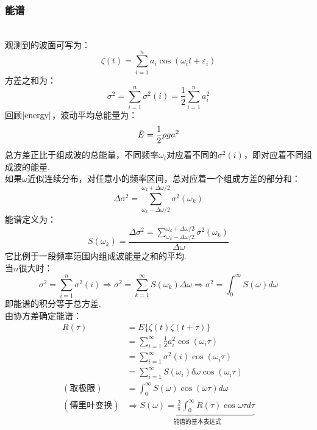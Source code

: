 \documentclass[a4paper,12pt]{article}
\begin{document}
    \subsubsection{能谱}~{}\\
    观测到的波面可写为：
    \[
        \zeta(t)=\sum_{i=1}^{n} a_{i} \cos \left(\omega_{i} t+\varepsilon_{i}\right)
    \]
    方差之和为：
    \[
        \sigma^{2}=\sum_{i=1}^{n} \sigma^{2}(i)=\frac{1}{2} \sum_{i=1}^{n} a_{i}^{2}
    \]
    回顾$\ref{energy}$，波动平均总能量为：
    \[
        \bar E = {1 \over 2}\rho g{a^2}
    \]
    总方差正比于组成波的总能量，不同频率$\displaystyle \omega_i$对应着不同的$\displaystyle \sigma^2(i)$，即对应着不同组成波的能量.\\
    如果$\omega$近似连续分布，对任意小的频率区间，总对应着一个组成方差的部分和：
    \[
        \Delta \sigma^{2}=\sum_{\omega_{k}-\Delta \omega / 2}^{\omega_{k}+\Delta \omega / 2} \sigma^{2}\left(\omega_{k}\right)
    \]
    能谱定义为：
    \[
        S(\omega_k)=\frac{\Delta \sigma^{2}=\sum_{\omega_{k}-\Delta \omega / 2}^{\omega_{k}+\Delta \omega / 2} \sigma^{2}\left(\omega_{k}\right)}{\Delta \omega}
    \]
    它比例于一段频率范围内组成波能量之和的平均.\\
    当$n$很大时：
    \[
        \sigma^{2}=\sum_{i=1}^{n} \sigma^{2}(i) \Rightarrow \sigma^{2}=\sum_{k=1}^{\infty} S\left(\omega_{k}\right) \Delta \omega \Rightarrow \sigma^{2}=\int_{0}^{\infty} S(\omega) d \omega
    \]
    即能谱的积分等于总方差.\\
    由协方差确定能谱：
    \[
        \begin{aligned}
            R(\tau)&=E\{\zeta(t)\zeta(t+\tau)\}\\
            &=\sum_{i=1}^{\infty}\frac{1}{2}a_i^2\cos (\omega_i \tau)\\
            &=\sum_{i=1}^{\infty} \sigma^{2}(i) \cos \left(\omega_{i} \tau\right)\\
            &=\sum_{i=1}^{\infty} S\left(\omega_{i}\right) \delta \omega \cos \left(\omega_{i} \tau\right)\\
            (\mbox{取极限})&=\int_{0}^{\infty} S(\omega) \cos (\omega \tau) d \omega\\
            (\mbox{傅里叶变换})&\Rightarrow \underbrace{S(\omega)=\frac{2}{\pi} \int_{0}^{\infty} R(\tau) \cos \omega \tau d \tau}_{\mbox{能谱的基本表达式}}
        \end{aligned}
    \]
\end{document}
